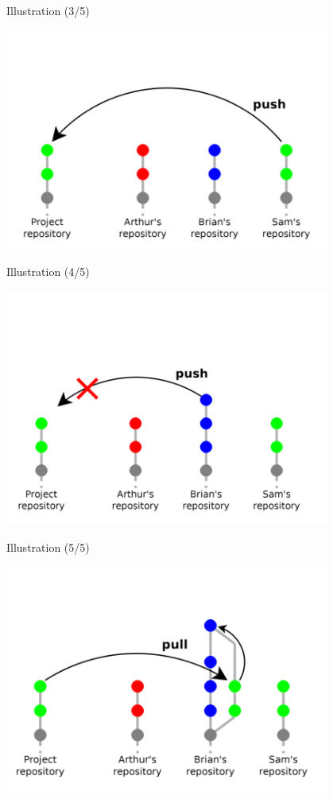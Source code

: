 \begin{frame}{%
\protect\hypertarget{illustration-35}{%
Illustration (3/5)}}

\includegraphics[width=0.8\textwidth]{images/centralise-3.png}

\end{frame}

\begin{frame}{%
\protect\hypertarget{illustration-45}{%
Illustration (4/5)}}

\includegraphics[width=0.8\textwidth]{images/centralise-4.png}

\end{frame}

\begin{frame}{%
\protect\hypertarget{illustration-55}{%
Illustration (5/5)}}

\includegraphics[width=0.8\textwidth]{images/centralise-5.png}

\end{frame}

